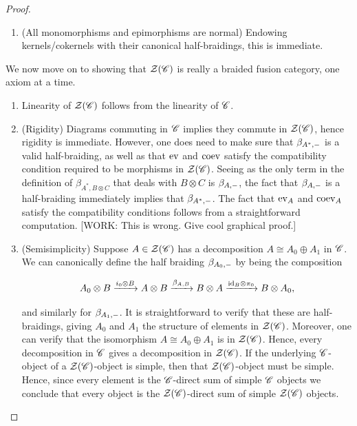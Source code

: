 \documentclass{article}
\theoremstyle{definition}
\numberwithin{figure}{section}
\begin{document}
\begin{proof}
\begin{enumerate}
It is straightforward to show to show that $(\ker f,\beta_{\ker,\--})$ is a valid element of $\Zcal(\Ccat)$, and is the kernel of $f$. This completes the proof.

\item (All monomorphisms and epimorphisms are normal) Endowing kernels/cokernels with their canonical half-braidings, this is immediate.
\end{enumerate}

We now move on to showing that $\Zcal(\Ccat)$ is really a braided fusion category, one axiom at a time.

\begin{enumerate}
\item Linearity of $\Zcal(\Ccat)$ follows from the linearity of $\mathscr{C}$.

\item (Rigidity) Diagrams commuting in $\mathscr{C}$ implies they commute in $\Zcal(\Ccat)$, hence rigidity is immediate. However, one does need to make sure that $\beta_{A^*,\--}$ is a valid half-braiding, as well as that $\mathrm{ev}$ and $\mathrm{coev}$ satisfy the compatibility condition required to be morphisms in $\Zcal(\Ccat)$. Seeing as the only term in the definition of $\beta_{A^*,B\otimes C}$ that deals with $B\otimes C$ is $\beta_{A,\--}$, the fact that $\beta_{A,\--}$ is a half-braiding immediately implies that $\beta_{A^*,\--}$. The fact that $\mathrm{ev}_A$ and $\mathrm{coev}_A$ satisfy the compatibility conditions follows from a straightforward computation. [WORK: This is wrong. Give cool graphical proof.]

\item (Semisimplicity) Suppose $A\in \mathcal{Z}(\mathscr{C})$ has a decomposition $A\cong A_0\oplus A_1$ in $\mathscr{C}$. We can canonically define the half braiding $\beta_{A_0,\--}$ by being the composition

$$A_0\otimes B\xrightarrow{i_0\otimes B} A\otimes B \xrightarrow{\beta_{A,B}}B\otimes A \xrightarrow{\mathrm{id}_{B}\otimes \pi_{0}}B\otimes A_0,$$

and similarly for $\beta_{A_1,\--}$. It is straightforward to verify that these are half-braidings, giving $A_0$ and $A_1$ the structure of elements in $\Zcal(\Ccat)$. Moreover, one can verify that the isomorphism $A\cong A_0\oplus A_1$ is in $\Zcal(\Ccat)$. Hence, every decomposition in $\mathscr{C}$ gives a decomposition in $\Zcal(\Ccat)$. If the underlying $\mathscr{C}$-object of a $\Zcal(\Ccat)$-object is simple, then that $\Zcal(\Ccat)$-object must be simple. Hence, since every element is the $\mathscr{C}$-direct sum of simple $\mathscr{C}$ objects we conclude that every object is the $\Zcal(\Ccat)$-direct sum of simple $\Zcal(\Ccat)$ objects.


\end{enumerate}
\end{proof}
\end{document}
